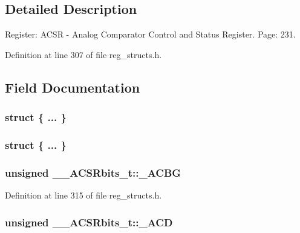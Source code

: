 \subsection{Detailed Description}
Register\+: A\+C\+S\+R -\/ Analog Comparator Control and Status Register. Page\+: 231. 

Definition at line 307 of file reg\+\_\+structs.\+h.



\subsection{Field Documentation}
\hypertarget{union_____a_c_s_rbits__t_a6e2cb9a6dd32099025d17551916e08cb}{\subsubsection[{"@73}]{\setlength{\rightskip}{0pt plus 5cm}struct \{ ... \} }}\label{union_____a_c_s_rbits__t_a6e2cb9a6dd32099025d17551916e08cb}
\hypertarget{union_____a_c_s_rbits__t_a3a6f705cea84331d544955bbfd8ab56f}{\subsubsection[{"@75}]{\setlength{\rightskip}{0pt plus 5cm}struct \{ ... \} }}\label{union_____a_c_s_rbits__t_a3a6f705cea84331d544955bbfd8ab56f}
\hypertarget{union_____a_c_s_rbits__t_a9fb6b4807e7022e7836a589c6e40d0fc}{
\subsubsection[{\+\_\+\+A\+C\+B\+G}]{\setlength{\rightskip}{0pt plus 5cm}unsigned \+\_\+\+\_\+\+A\+C\+S\+Rbits\+\_\+t\+::\+\_\+\+A\+C\+B\+G}}\label{union_____a_c_s_rbits__t_a9fb6b4807e7022e7836a589c6e40d0fc}


Definition at line 315 of file reg\+\_\+structs.\+h.

\hypertarget{union_____a_c_s_rbits__t_acec62737754d657371db94b593e14751}{
\subsubsection[{\+\_\+\+A\+C\+D}]{\setlength{\rightskip}{0pt plus 5cm}unsigned \+\_\+\+\_\+\+A\+C\+S\+Rbits\+\_\+t\+::\+\_\+\+A\+C\+D}}\label{union_____a_c_s_rbits__t_acec62737754d657371db94b593e14751}


